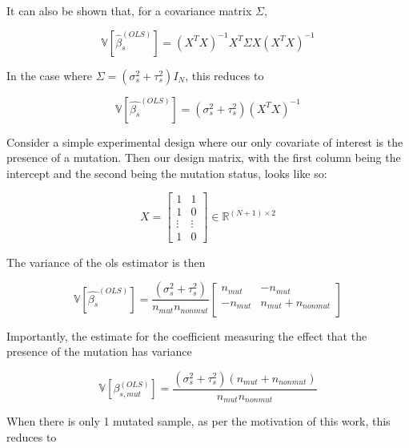 It can also be shown that, for a covariance matrix $\Sigma$,

\begin{equation*}
  \mathbb{V} \left[ \hat{\beta}_s^{(OLS)} \right] = (X^TX)^{-1} X^T \Sigma X (X^TX)^{-1}
\end{equation*}

In the case where $\Sigma = (\sigma_s^2 + \tau_s^2)I_N$, this reduces to

\begin{equation*}
  \mathbb{V} \left[ \hat{\beta_s}^{(OLS)} \right] = (\sigma_s^2 + \tau_s^2)(X^TX)^{-1}
\end{equation*}

Consider a simple experimental design where our only covariate of interest is the presence of a mutation.
Then our design matrix, with the first column being the intercept and the second being the mutation status, looks like so:

\begin{equation*}
  X = \begin{bmatrix}
  1 & 1 \\
  1 & 0 \\
  \vdots & \vdots \\
  1 & 0
  \end{bmatrix}
\in \mathbb{R}^{(N + 1) \times 2}
\end{equation*}

The variance of the \gls{ols} estimator is then

\begin{equation*}
  \mathbb{V} \left[ \hat{\beta_s}^{(OLS)} \right] = \frac{(\sigma_s^2 + \tau_s^2)}{n_{mut} n_{nonmut}}
  \begin{bmatrix}
    n_{mut} & -n_{mut} \\
    - n_{mut} & n_{mut} + n_{nonmut} \\
  \end{bmatrix}
\end{equation*}

Importantly, the estimate for the coefficient measuring the effect that the presence of the mutation has variance

\begin{equation*}
  \mathbb{V} \left[\beta_{s, mut}^{(OLS)} \right] = \frac{(\sigma_s^2 + \tau_s^2)(n_{mut} + n_{nonmut})}{n_{mut} n_{nonmut}}
\end{equation*}

When there is only 1 mutated sample, as per the motivation of this work, this reduces to

